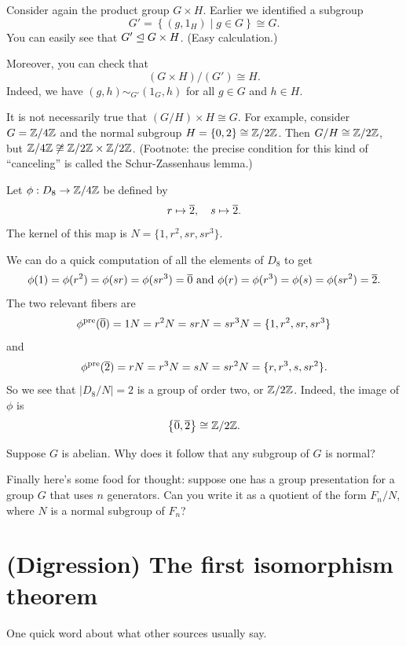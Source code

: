 \begin{example}
	Consider again the product group $G \times H$.
	Earlier we identified a subgroup
	\[ G' =  \left\{ (g, 1_H) \mid g \in G \right\} \cong G. \]
	You can easily see that $G' \trianglelefteq G \times H$.
	(Easy calculation.)

	Moreover, you can check that
	\[ (G \times H) / (G') \cong H. \]
	Indeed, we have $(g, h) \sim_{G'} (1_G, h)$ for all $g \in G$ and $h \in H$.
\end{example}
\begin{example}
	It is not necessarily true that $(G/H) \times H \cong G$.
	For example, consider $G = \mathbb Z/4\mathbb Z$
	and the normal subgroup $H = \{0,2\} \cong \mathbb Z/2\mathbb Z$.
	Then $G/H \cong \mathbb Z/2\mathbb Z$,
	but $\mathbb Z/4\mathbb Z \not\cong \mathbb Z/2\mathbb Z \times \mathbb Z/2\mathbb Z$.
	(Footnote: the precise condition for this kind of ``canceling'' is called the Schur-Zassenhaus lemma.)
\end{example}
\begin{example}
	Let $\phi: D_8 \to \mathbb Z/4\mathbb Z$ be defined by \[ r \mapsto \overline 2, \quad s \mapsto \overline 2. \]
	The kernel of this map is $N = \{1,r^2,sr,sr^3\}$.

	We can do a quick computation of all the elements of $D_8$ to get
	\[ \phi(1) = \phi(r^2) = \phi(sr) = \phi(sr^3) = \overline 0
	\text{ and }
	 \phi(r) = \phi(r^3) = \phi(s) = \phi(sr^2) = \overline 2. \]
	The two relevant fibers are \[ \phi^{\text{pre}}(\overline 0) = 1N = r^2N = srN = sr^3N = \{1,r^2,sr,sr^3\} \] and
	\[ \phi^{\text{pre}}(\overline 2) = rN = r^3N = sN = sr^2N = \{r,r^3,s,sr^2\}. \]
	So we see that $|D_8/N| = 2$ is a group of order two, or $\mathbb Z/2\mathbb Z$.
	Indeed, the image of $\phi$ is \[ \left\{ \overline 0, \overline 2 \right\} \cong \mathbb Z/2\mathbb Z. \]
\end{example}

\begin{ques}
	Suppose $G$ is abelian.
	Why does it follow that any subgroup of $G$ is normal?
\end{ques}


Finally here's some food for thought:
suppose one has a group presentation for a group $G$
that uses $n$ generators.
Can you write it as a quotient of the form $F_n / N$,
where $N$ is a normal subgroup of $F_n$?

\section{(Digression) The first isomorphism theorem}
\label{sec:first_isomorphism_thm}
One quick word about what other sources usually say.

